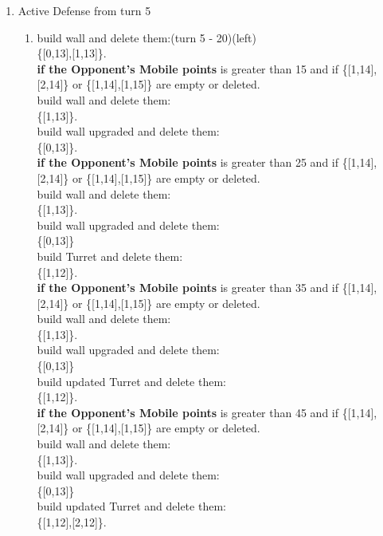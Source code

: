 \documentclass[12pt]{article}
\begin{document}
\begin{enumerate}
\begin{enumerate}
\end{enumerate}
\item Active Defense from turn 5
\begin{enumerate}
\item build wall and delete them:(turn 5 - 20)(left)\\ \{[0,13],[1,13]\}. \\ \textbf{if the Opponent's Mobile points} is greater than 15 and if \{[1,14],[2,14]\} or \{[1,14],[1,15]\} are empty or deleted. \\ build wall and delete them:\\ \{[1,13]\}.\\  build wall upgraded and delete them:\\ \{[0,13]\}.\\ \textbf{if the Opponent's Mobile points} is greater than 25 and if \{[1,14],[2,14]\} or \{[1,14],[1,15]\} are empty or deleted. \\ build wall and delete them:\\ \{[1,13]\}.\\  build wall upgraded and delete them:\\ \{[0,13]\}\\build Turret and delete them:\\ \{[1,12]\}.\\ \textbf{if the Opponent's Mobile points} is greater than 35 and if \{[1,14],[2,14]\} or \{[1,14],[1,15]\} are empty or deleted. \\ build wall and delete them:\\ \{[1,13]\}.\\  build wall upgraded and delete them:\\ \{[0,13]\}\\build updated Turret and delete them:\\ \{[1,12]\}.\\ \textbf{if the Opponent's Mobile points} is greater than 45 and if \{[1,14],[2,14]\} or \{[1,14],[1,15]\} are empty or deleted. \\ build wall and delete them:\\ \{[1,13]\}.\\  build wall upgraded and delete them:\\ \{[0,13]\}\\build updated Turret and delete them:\\ \{[1,12],[2,12]\}.

\end{enumerate}
\end{enumerate}
\end{document}

